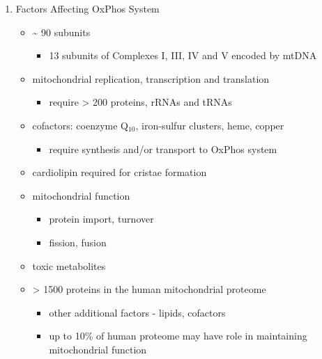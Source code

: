 \documentclass{scrartcl}
\begin{document}
\begin{enumerate}
\begin{enumerate}
\item Factors Affecting OxPhos System
\label{sec:org18e16e2}
\begin{itemize}
\item \textasciitilde{} 90 subunits
\begin{itemize}
\item 13 subunits of Complexes I, III, IV and V encoded by mtDNA
\end{itemize}
\item mitochondrial replication, transcription and translation
\begin{itemize}
\item require \textgreater{} 200 proteins, rRNAs and tRNAs
\end{itemize}
\item cofactors: coenzyme Q\(_{\text{10}}\), iron-sulfur clusters, heme, copper
\begin{itemize}
\item require synthesis and/or transport to OxPhos system
\end{itemize}
\item cardiolipin required for cristae formation
\item mitochondrial function
\begin{itemize}
\item protein import, turnover
\item fission, fusion
\end{itemize}
\item toxic metabolites
\item \textgreater{} 1500 proteins in the human mitochondrial proteome
\begin{itemize}
\item other additional factors - lipids, cofactors
\item up to 10\% of human proteome may have role in maintaining mitochondrial function
\end{itemize}


\end{itemize}
\end{enumerate}
\end{enumerate}
\end{document}
